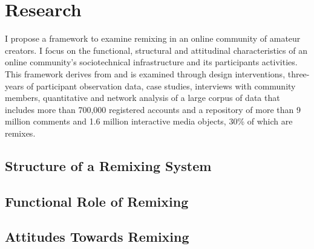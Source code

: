 \chapter{Research}

I propose a framework to examine remixing in an online community of amateur creators. I focus on the functional, structural and attitudinal characteristics of an online community's sociotechnical infrastructure and its participants activities.
This framework derives from and is examined through design interventions, three-years of participant observation data, case studies, interviews with community members, quantitative and network analysis of a large corpus of data that includes more than 700,000 registered accounts and a repository of more than 9 million comments and 1.6 million interactive media objects, 30\% of which are remixes.

\section{Structure of a Remixing System}


\section{Functional Role of Remixing}


\section{Attitudes Towards Remixing}


